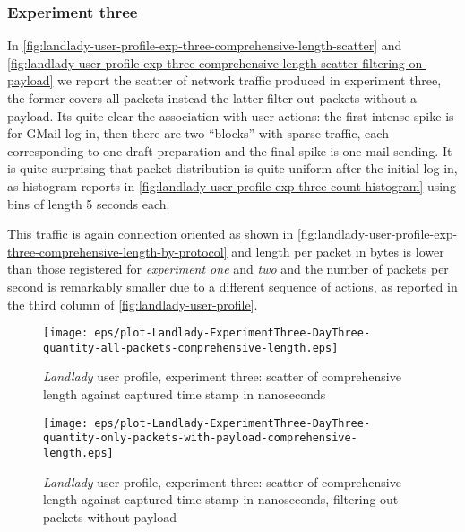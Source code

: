 \documentclass[10pt,a4paper]{article}
\begin{document}
    \subsubsection*{Experiment three}
    In
    \autoref{fig:landlady-user-profile-exp-three-comprehensive-length-scatter}
    and
    \autoref{fig:landlady-user-profile-exp-three-comprehensive-length-scatter-filtering-on-payload}
    we report the scatter of network traffic produced in experiment
    three, the former covers all packets instead the latter filter out
    packets without a payload. Its quite clear the association with
    user actions: the first intense spike is for GMail log in, then
    there are two ``blocks'' with sparse traffic, each corresponding
    to one draft preparation and the final spike is one mail
    sending. It is quite surprising that packet distribution is quite
    uniform after the initial log in, as histogram reports in
    \autoref{fig:landlady-user-profile-exp-three-count-histogram}
    using bins of length 5 seconds each.

    This traffic is again connection oriented as shown in
    \autoref{fig:landlady-user-profile-exp-three-comprehensive-length-by-protocol}
    and length per packet in bytes is lower than those registered for
    \emph{experiment one} and \emph{two} and the number of packets per
    second is remarkably smaller due to a different sequence of
    actions, as reported in the third column of
    \autoref{fig:landlady-user-profile}.

    \begin{figure}
      \centering
      \texttt{[image: eps/plot-Landlady-ExperimentThree-DayThree-quantity-all-packets-comprehensive-length.eps]}
      \caption{\emph{Landlady} user profile, experiment three: scatter
        of comprehensive length against captured time stamp in
        nanoseconds}
      \label{fig:landlady-user-profile-exp-three-comprehensive-length-scatter}
    \end{figure}

    \begin{figure}
      \centering
      \texttt{[image: eps/plot-Landlady-ExperimentThree-DayThree-quantity-only-packets-with-payload-comprehensive-length.eps]}
      \caption{\emph{Landlady} user profile, experiment three: scatter
        of comprehensive length against captured time stamp in
        nanoseconds, filtering out packets without payload}
      \label{fig:landlady-user-profile-exp-three-comprehensive-length-scatter-filtering-on-payload}
    \end{figure}
    
\end{document}

